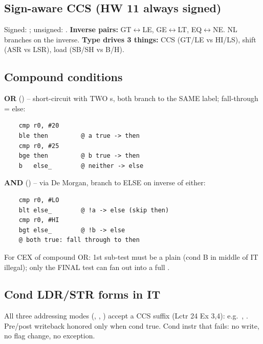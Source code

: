 \subsection{Sign-aware CCS (HW 11 always signed)}
Signed: ; unsigned: . \textbf{Inverse pairs:} GT$\leftrightarrow$LE, GE$\leftrightarrow$LT, EQ$\leftrightarrow$NE. NL branches on the inverse. \textbf{Type drives 3 things:} CCS (GT/LE vs HI/LS), shift (ASR vs LSR), load (SB/SH vs B/H).

\subsection{Compound conditions}
\textbf{OR} () -- short-circuit with TWO s, both branch to the SAME  label; fall-through = else:
\begin{lstlisting}
    cmp r0, #20
    ble then         @ a true -> then
    cmp r0, #25
    bge then         @ b true -> then
    b   else_        @ neither -> else
\end{lstlisting}
\textbf{AND} () -- via De Morgan, branch to ELSE on inverse of either:
\begin{lstlisting}
    cmp r0, #LO
    blt else_        @ !a -> else (skip then)
    cmp r0, #HI
    bgt else_        @ !b -> else
    @ both true: fall through to then
\end{lstlisting}
For CEX of compound OR: 1st sub-test must be a plain  (cond B in middle of IT illegal); only the FINAL test can fan out into a full .

\subsection{Cond LDR/STR forms in IT}
All three addressing modes (\asm{[Rn,\#os]}, \asm{[Rn,\#os]!}, ) accept a CCS suffix (Lctr 24 Ex 3,4): e.g.\ , . Pre/post writeback honored only when cond true. Cond instr that fails: no write, no flag change, no exception.

